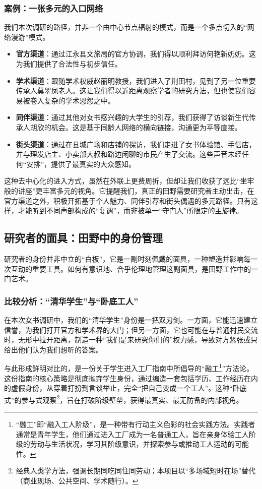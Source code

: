 \documentclass[UTF8]{ctexart}
\begin{document}
\subsubsection{案例：一张多元的入口网络}
我们本次调研的路径，并非一个由中心节点辐射的模式，而是一个多点切入的“网络漫游”模式。
\begin{itemize}
    \item \textbf{官方渠道}：通过江永县文旅局的官方协调，我们得以顺利拜访何艳新奶奶。这为我们提供了合法性与初步信任。
    \item \textbf{学术渠道}：跟随学术权威赵丽明教授，我们进入了荆田村，见到了另一位重要传承人莫翠凤老人。这让我们得以近距离观察学者的研究方法，但也使我们容易被卷入复杂的学术恩怨之中。
    \item \textbf{同伴渠道}：通过其他对女书感兴趣的大学生的引荐，我们获得了访谈新生代传承人胡欣的机会。这是基于同龄人网络的横向链接，沟通更为平等直接。
    \item \textbf{街头渠道}：通过在县城广场和店铺的探访，我们走进了女书体验馆、手信店，并与理发店主、小卖部大叔和路边闲聊的市民产生了交流。这些声音未经任何“安排”，提供了最真实的大众感知。
\end{itemize}
这种去中心化的进入方式，虽然在外联上更费周折，但却让我们收获了远比“坐牢般的讲座”更丰富多元的视角。它提醒我们，真正的田野需要研究者主动出击，在官方渠道之外，积极开拓基于个人魅力、同伴引荐和街头偶遇的多元路径。只有这样，才能听到不同声部构成的“复调”，而非被单一“守门人”所限定的主旋律。

\subsection{研究者的面具：田野中的身份管理}
研究者的身份并非中立的“白板”，它是一副时刻佩戴的面具，一种塑造并影响每一次互动的重要工具。如何有意识地、合乎伦理地管理这副面具，是田野工作中的一门艺术。

\subsubsection{比较分析：“清华学生”与“卧底工人”}
在本次女书调研中，我们的“清华学生”身份是一把双刃剑。一方面，它能迅速建立信誉，为我们打开官方和学术界的大门；但另一方面，它也可能在与普通村民交流时，无形中拉开距离，制造一种“我们是来研究你们的”权力感，导致对方紧张或只给出他们认为我们想听的答案。

与此形成鲜明对比的，是一份关于学生进入工厂指南中所倡导的“融工\footnote[1]{“融工”即“融入工人阶级”，是一种带有行动主义色彩的社会实践方法。实践者通常是青年学生，他们通过进入工厂成为一名普通工人，旨在亲身体验工人阶级的劳动与生活状况，学习其阶级意识，并探索参与或推动工人运动的可能性。}”方法论。这份指南的核心策略是彻底抛弃学生身份，通过编造一套包括学历、工作经历在内的虚假身份，从穿着打扮到言谈举止，完全“把自己变成一个工人”。这种“卧底式”的参与式观察\footnote[1]{经典人类学方法，强调长期同吃同住同劳动；本项目以“多场域短时在场”替代（商业现场、公共空间、学术随行）。}，旨在打破阶级壁垒，获得最真实、最无防备的内部视角。
\end{document}
